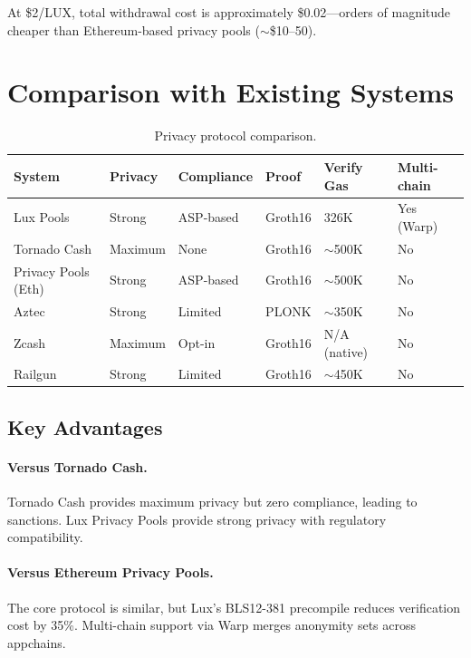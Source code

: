 \documentclass[11pt,a4paper]{article}
\begin{document}
At \$2/LUX, total withdrawal cost is approximately \$0.02---orders of magnitude cheaper than Ethereum-based privacy pools ($\sim$\$10--50).

\section{Comparison with Existing Systems}\label{sec:comparison}

\begin{table}[H]
\centering
\caption{Privacy protocol comparison.}
\label{tab:comparison}
\begin{tabular}{p{2.2cm}p{1.8cm}p{1.8cm}p{1.8cm}p{2cm}p{2cm}}
\toprule
\textbf{System} & \textbf{Privacy} & \textbf{Compliance} & \textbf{Proof} & \textbf{Verify Gas} & \textbf{Multi-chain} \\
\midrule
Lux Pools & Strong & ASP-based & Groth16 & 326K & Yes (Warp) \\
Tornado Cash & Maximum & None & Groth16 & $\sim$500K & No \\
Privacy Pools (Eth) & Strong & ASP-based & Groth16 & $\sim$500K & No \\
Aztec & Strong & Limited & PLONK & $\sim$350K & No \\
Zcash & Maximum & Opt-in & Groth16 & N/A (native) & No \\
Railgun & Strong & Limited & Groth16 & $\sim$450K & No \\
\bottomrule
\end{tabular}
\end{table}

\subsection{Key Advantages}

\paragraph{Versus Tornado Cash.} Tornado Cash provides maximum privacy but zero compliance, leading to sanctions. Lux Privacy Pools provide strong privacy with regulatory compatibility.

\paragraph{Versus Ethereum Privacy Pools.} The core protocol is similar, but Lux's BLS12-381 precompile reduces verification cost by 35\%. Multi-chain support via Warp merges anonymity sets across appchains.
\end{document}
